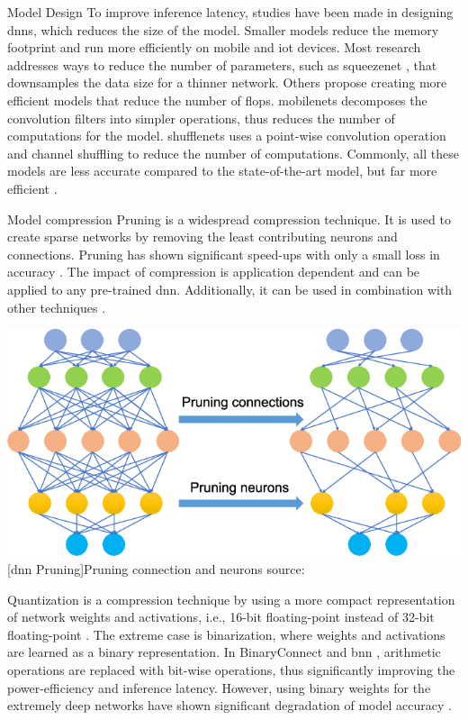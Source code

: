 \begin{enumdescript}
	\item[Model Design] To improve inference latency, studies have been made in designing \gls{dnn}s, which reduces the size of the model. Smaller models reduce the memory footprint and run more efficiently on mobile and \gls{iot} devices. Most research addresses ways to reduce the number of parameters, such as \gls{squeezenet} \cite{iandola_squeezenet:_2016}, that downsamples the data size for a thinner network. Others propose creating more efficient models that reduce the number of \acrshort{flop}s. \gls{mobilenet}s \cite{howard_mobilenets:_2017,sandler_mobilenetv2:_2018} decomposes the convolution filters into simpler operations, thus reduces the number of computations for the model. \gls{shufflenet}s \cite{zhang_shufflenet:_2017, ma_shufflenet_2018} uses a point-wise convolution operation and channel shuffling to reduce the number of computations. Commonly, all these models are less accurate compared to the state-of-the-art model, but far more efficient \cite{bianco_benchmark_2018}. 
		
	\item[Model compression] Pruning is a widespread compression technique. It is used to create sparse networks by removing the least contributing neurons and connections. Pruning has shown significant speed-ups with only a small loss in accuracy \cite{zhou_edge_2019}. The impact of compression is application dependent and can be applied to any pre-trained \gls{dnn}. Additionally, it can be used in combination with other techniques \cite{cheng_survey_2017}.
	
	\begin{minipage}[t]{\linewidth}
		\centering
		\includegraphics[width=.4\linewidth]{figures/articles/Pruning-a-neural-network}
		[\gls{dnn} Pruning]{Pruning connection and neurons source:  \cite{chen_deep_2019}}
	\end{minipage}
	
	Quantization is a compression technique by using a more compact representation of network weights and activations, i.e., 16-bit floating-point instead of 32-bit floating-point \cite{cheng_survey_2017}. The extreme case is binarization, where weights and activations are learned as a binary representation. In BinaryConnect \cite{courbariaux_binaryconnect:_2015} and \gls{bnn} \cite{courbariaux_binarized_2016}, arithmetic operations are replaced with bit-wise operations, thus significantly improving the power-efficiency and inference latency. However, using binary weights for the extremely deep networks have shown significant degradation of model accuracy \cite{cheng_survey_2017}.
	

\end{enumdescript}
